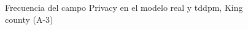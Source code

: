 \begin{figure}[H]
    \centering
    
    \caption{Frecuencia del campo Privacy en el modelo real y tddpm, King county (A-3)}
    \label{frecuency-tddpm-privacy}
\end{figure}